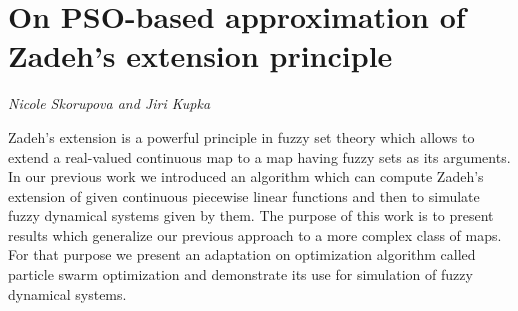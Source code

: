 \documentclass[../booklet.tex]{subfiles}
\begin{document}
\section[On PSO-based approximation of Zadeh’s extension principle. {\it Nicole Skorupova and Jiri Kupka}]{On PSO-based approximation of Zadeh’s extension principle}
 

\begin{center}
  {\it Nicole Skorupova and Jiri Kupka}
\end{center}

\vskip 0.8cm


Zadeh's extension is a powerful principle in fuzzy set theory which allows to extend a real-valued continuous map to a map having fuzzy sets as its arguments. In our previous work we introduced an algorithm which can compute Zadeh’s extension of given continuous piecewise linear functions and then to simulate fuzzy dynamical systems given by them. The purpose of this work is to present results which generalize our previous approach to a more complex class of maps. For that purpose we present an adaptation on optimization algorithm called particle swarm optimization and demonstrate its use for simulation of fuzzy dynamical systems.

\end{document}
